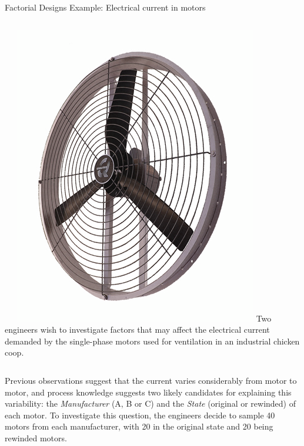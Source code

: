 \documentclass[t]{beamer}
\begin{document}
\begin{ftst}
{Factorial Designs}
{Example: Electrical current in motors}
\begin{columns}
\vspace{-1.5em}\ \ \ \includegraphics[width=.8\textwidth]{../figs/ventilador.png}
 Two engineers wish to investigate factors that may affect the electrical current demanded by the single-phase motors used for ventilation in an industrial chicken coop.
\end{columns}
\vhalf
Previous observations suggest that the current varies considerably from motor to motor, and process knowledge suggests two likely candidates for explaining this variability: the \textit{Manufacturer} (A, B or C) and the \textit{State} (original or rewinded) of each motor.
\vone
To investigate this question, the engineers decide to sample 40 motors from each manufacturer, with 20 in the original state and 20 being rewinded motors.
\end{ftst}
\end{document}
